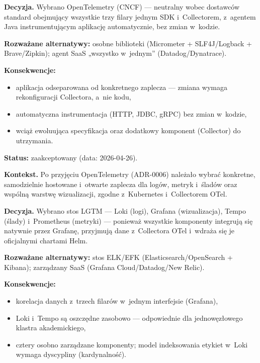\textbf{Decyzja.} Wybrano OpenTelemetry (CNCF) --- neutralny wobec dostawców standard obejmujący wszystkie trzy filary jednym SDK i~Collectorem, z~agentem Java instrumentującym aplikację automatycznie, bez zmian w~kodzie.

\textbf{Rozważane alternatywy:} osobne biblioteki (Micrometer + SLF4J/Logback + Brave/Zipkin); agent SaaS „wszystko w~jednym” (Datadog/Dynatrace).

\textbf{Konsekwencje:}
\begin{itemize}
  \item[$+$] aplikacja odseparowana od konkretnego zaplecza --- zmiana wymaga rekonfiguracji Collectora, a~nie kodu,
  \item[$+$] automatyczna instrumentacja (HTTP, JDBC, gRPC) bez zmian w~kodzie,
  \item[$-$] wciąż ewoluująca specyfikacja oraz dodatkowy komponent (Collector) do utrzymania.
\end{itemize}


\textbf{Status:} zaakceptowany (data: 2026-04-26).

\textbf{Kontekst.} Po przyjęciu OpenTelemetry (ADR-0006) należało wybrać konkretne, samodzielnie hostowane i~otwarte zaplecza dla logów, metryk i~śladów oraz wspólną warstwę wizualizacji, zgodne z~Kubernetes i~Collectorem OTel.

\textbf{Decyzja.} Wybrano stos LGTM --- Loki (logi), Grafana (wizualizacja), Tempo (ślady) i~Prometheus (metryki) --- ponieważ wszystkie komponenty integrują się natywnie przez Grafanę, przyjmują dane z~Collectora OTel i~wdraża się je oficjalnymi chartami Helm.

\textbf{Rozważane alternatywy:} stos ELK/EFK (Elasticsearch/OpenSearch + Kibana); zarządzany SaaS (Grafana Cloud/Datadog/New Relic).

\textbf{Konsekwencje:}
\begin{itemize}
  \item[$+$] korelacja danych z~trzech filarów w~jednym interfejsie (Grafana),
  \item[$+$] Loki i~Tempo są oszczędne zasobowo --- odpowiednie dla jednowęzłowego klastra akademickiego,
  \item[$-$] cztery osobno zarządzane komponenty; model indeksowania etykiet w~Loki wymaga dyscypliny (kardynalność).
\end{itemize}


